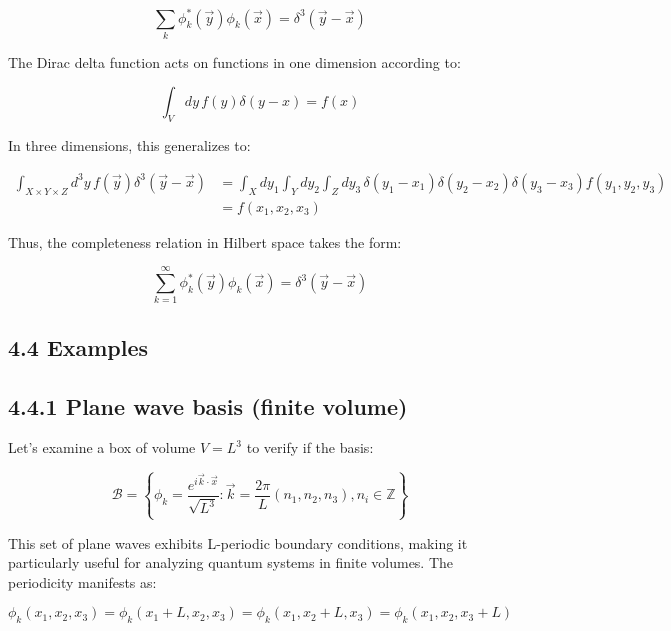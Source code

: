 \documentclass[10pt]{article}
\begin{document}
\begin{equation*}
\sum_k \phi_k^*(\vec{y})\phi_k(\vec{x}) = \delta^3(\vec{y}-\vec{x}) \tag{4.30}
\end{equation*}

The Dirac delta function acts on functions in one dimension according to:

\begin{equation*}
\int_V dy\, f(y)\delta(y-x) = f(x) \tag{4.31}
\end{equation*}

In three dimensions, this generalizes to:

\begin{align*}
\int_{X \times Y \times Z} d^3y\, f(\vec{y})\delta^3(\vec{y}-\vec{x}) &= \int_X dy_1 \int_Y dy_2 \int_Z dy_3\, \delta(y_1-x_1)\delta(y_2-x_2)\delta(y_3-x_3)f(y_1,y_2,y_3) \\
&= f(x_1,x_2,x_3) \tag{4.32}
\end{align*}

Thus, the completeness relation in Hilbert space takes the form:

\begin{equation*}
\sum_{k=1}^{\infty} \phi_k^*(\vec{y})\phi_k(\vec{x}) = \delta^3(\vec{y}-\vec{x}) \tag{4.33}
\end{equation*}

\subsection*{4.4 Examples}
\subsection*{4.4.1 Plane wave basis (finite volume)}
Let's examine a box of volume $V = L^3$ to verify if the basis:


\begin{equation*}
\mathcal{B} = \left\{\phi_k = \frac{e^{i\vec{k}\cdot\vec{x}}}{\sqrt{L^3}}: \vec{k} = \frac{2\pi}{L}(n_1, n_2, n_3), n_i \in \mathbb{Z}\right\} \tag{4.34}
\end{equation*}

This set of plane waves exhibits L-periodic boundary conditions, making it particularly useful for analyzing quantum systems in finite volumes. The periodicity manifests as:

\begin{equation*}
\phi_k(x_1, x_2, x_3) = \phi_k(x_1+L, x_2, x_3) = \phi_k(x_1, x_2+L, x_3) = \phi_k(x_1, x_2, x_3+L) \tag{4.35}
\end{equation*}
\end{document}
